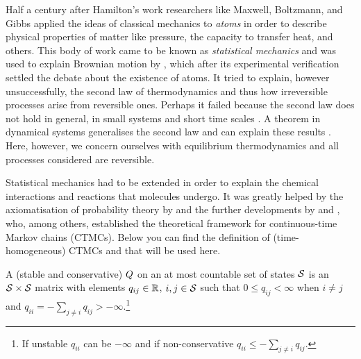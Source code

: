 Half a century after Hamilton's work
researchers like Maxwell, Boltzmann, and Gibbs
applied the ideas of classical mechanics to \emph{atoms}
in order to describe physical properties of matter like pressure,
the capacity to transfer heat, and others.
This body of work came to be known as \emph{statistical mechanics}
and was used to explain Brownian motion by \citet{einstein-brownian},
which after its experimental verification \citep{perrin}
settled the debate about the existence of atoms.
It tried to explain, however unsuccessfully,
the second law of thermodynamics
and thus how irreversible processes arise from reversible ones.
Perhaps it failed because the second law does not hold
in general, \eg in small systems and short time scales \citep{ft-lab}.
A theorem in dynamical systems generalises the second law
and can explain these results \citep{ft}.
Here, however, we concern ourselves with equilibrium thermodynamics
and all processes considered are reversible.

Statistical mechanics had to be extended in order to explain
the chemical interactions and reactions that molecules undergo.
It was greatly helped by
the axiomatisation of probability theory by \citet{kolmogorov}
and the further developments by \citet{doob} and \citet{feller},
who, among others, established the theoretical framework
for continuous-time Markov chains (CTMCs).
Below you can find the definition of (time-homogeneous) CTMCs
and \qmatrices that will be used here.

\begin{definition}%
  A (stable and conservative) \emph{\qmatrix} $Q$
  on an at most countable set of states $\mathcal{S}$
  is an $\mathcal{S} \times \mathcal{S}$ matrix
  with elements $q_{ij} \in \mathbb{R}$, $i,j \in \mathcal{S}$
  such that $0 \leqslant q_{ij} < \infty$ when $i \neq j$
  and $q_{ii} = - \sum_{j \neq i} q_{ij} > -\infty$.\footnote{
    If unstable $q_{ii}$ can be $-\infty$ and if non-conservative
    $q_{ii} \leqslant - \sum_{j \neq i} q_{ij}$.}
\end{definition}

